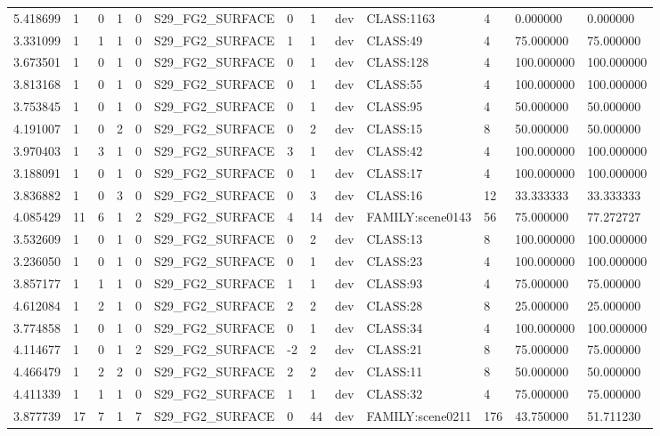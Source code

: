 \begin{tabular}{lllllllllllll}
5.418699 & 1 & 0 & 1 & 0 & S29\_FG2\_SURFACE & 0 & 1 & dev & CLASS:1163 & 4 & 0.000000 & 0.000000 \\
3.331099 & 1 & 1 & 1 & 0 & S29\_FG2\_SURFACE & 1 & 1 & dev & CLASS:49 & 4 & 75.000000 & 75.000000 \\
3.673501 & 1 & 0 & 1 & 0 & S29\_FG2\_SURFACE & 0 & 1 & dev & CLASS:128 & 4 & 100.000000 & 100.000000 \\
3.813168 & 1 & 0 & 1 & 0 & S29\_FG2\_SURFACE & 0 & 1 & dev & CLASS:55 & 4 & 100.000000 & 100.000000 \\
3.753845 & 1 & 0 & 1 & 0 & S29\_FG2\_SURFACE & 0 & 1 & dev & CLASS:95 & 4 & 50.000000 & 50.000000 \\
4.191007 & 1 & 0 & 2 & 0 & S29\_FG2\_SURFACE & 0 & 2 & dev & CLASS:15 & 8 & 50.000000 & 50.000000 \\
3.970403 & 1 & 3 & 1 & 0 & S29\_FG2\_SURFACE & 3 & 1 & dev & CLASS:42 & 4 & 100.000000 & 100.000000 \\
3.188091 & 1 & 0 & 1 & 0 & S29\_FG2\_SURFACE & 0 & 1 & dev & CLASS:17 & 4 & 100.000000 & 100.000000 \\
3.836882 & 1 & 0 & 3 & 0 & S29\_FG2\_SURFACE & 0 & 3 & dev & CLASS:16 & 12 & 33.333333 & 33.333333 \\
4.085429 & 11 & 6 & 1 & 2 & S29\_FG2\_SURFACE & 4 & 14 & dev & FAMILY:scene0143 & 56 & 75.000000 & 77.272727 \\
3.532609 & 1 & 0 & 1 & 0 & S29\_FG2\_SURFACE & 0 & 2 & dev & CLASS:13 & 8 & 100.000000 & 100.000000 \\
3.236050 & 1 & 0 & 1 & 0 & S29\_FG2\_SURFACE & 0 & 1 & dev & CLASS:23 & 4 & 100.000000 & 100.000000 \\
3.857177 & 1 & 1 & 1 & 0 & S29\_FG2\_SURFACE & 1 & 1 & dev & CLASS:93 & 4 & 75.000000 & 75.000000 \\
4.612084 & 1 & 2 & 1 & 0 & S29\_FG2\_SURFACE & 2 & 2 & dev & CLASS:28 & 8 & 25.000000 & 25.000000 \\
3.774858 & 1 & 0 & 1 & 0 & S29\_FG2\_SURFACE & 0 & 1 & dev & CLASS:34 & 4 & 100.000000 & 100.000000 \\
4.114677 & 1 & 0 & 1 & 2 & S29\_FG2\_SURFACE & -2 & 2 & dev & CLASS:21 & 8 & 75.000000 & 75.000000 \\
4.466479 & 1 & 2 & 2 & 0 & S29\_FG2\_SURFACE & 2 & 2 & dev & CLASS:11 & 8 & 50.000000 & 50.000000 \\
4.411339 & 1 & 1 & 1 & 0 & S29\_FG2\_SURFACE & 1 & 1 & dev & CLASS:32 & 4 & 75.000000 & 75.000000 \\
3.877739 & 17 & 7 & 1 & 7 & S29\_FG2\_SURFACE & 0 & 44 & dev & FAMILY:scene0211 & 176 & 43.750000 & 51.711230 \\

\end{tabular}
